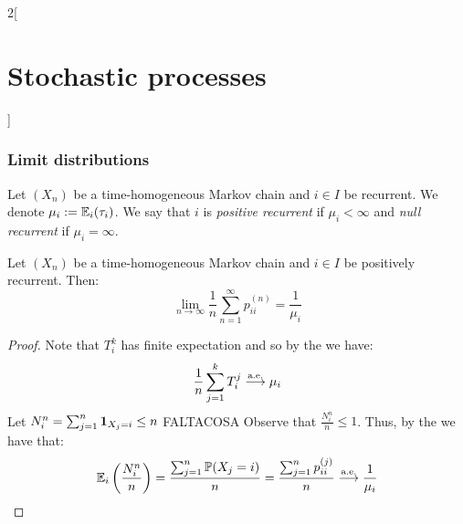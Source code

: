 \documentclass[../../../main_math.tex]{subfiles}
\begin{document}
\begin{multicols}{2}[\section{Stochastic processes}]
  \subsubsection{Limit distributions}
  \begin{definition}
    Let $(X_n)$ be a time-homogeneous Markov chain and $i\in I$ be recurrent. We denote $\mu_i:=\mathbb{E}_i(\tau_i)$. We say that $i$ is \emph{positive recurrent} if $\mu_i<\infty$ and \emph{null recurrent} if $\mu_i=\infty$.
  \end{definition}
  \begin{theorem}
    Let $(X_n)$ be a time-homogeneous Markov chain and $i\in I$ be positively recurrent. Then:
    $$
      \lim_{n\to\infty}\frac{1}{n}\sum_{n=1}^\infty p_{ii}^{(n)}=\frac{1}{\mu_i}
    $$
  \end{theorem}
  \begin{proof}
    Note that $T_i^k$ has finite expectation and so by the  we have:
    $$\frac{1}{n}\sum_{j=1}^{k}T_i^j\overset{\text{a.e.}}{\longrightarrow}\mu_i$$
    Let $N_i^n=\sum_{j=1}^n\boldsymbol{\mathrm{1}}_{X_j=i}\leq n$
    FALTACOSA
    Observe that $\frac{N_i^n}{n}\leq 1$. Thus, by the  we have that:
    $$
      \mathbb{E}_i\left(\frac{N_i^n}{n}\right)=\frac{\sum_{j=1}^n \mathbb{P}(X_j=i)}{n}=\frac{\sum_{j=1}^n p_{ii}^{(j)}}{n}\overset{\text{a.e.}}{\longrightarrow}\frac{1}{\mu_i}
    $$
  \end{proof}
\end{multicols}
\end{document}
